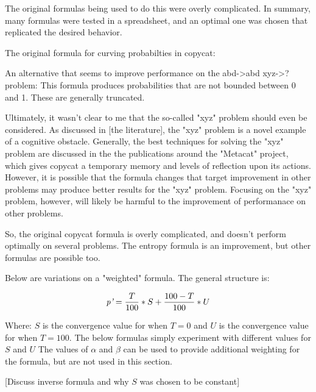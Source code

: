 \documentclass[a4paper]{article}
\begin{document}
            The original formulas being used to do this were overly complicated.
            In summary, many formulas were tested in a spreadsheet, and an optimal one was chosen that replicated the desired behavior.

            The original formula for curving probabilties in copycat:
            

            An alternative that seems to improve performance on the abd->abd xyz->? problem:
            This formula produces probabilities that are not bounded between 0 and 1. These are generally truncated.
            

            Ultimately, it wasn't clear to me that the so-called "xyz" problem should even be considered.
            As discussed in [the literature], the "xyz" problem is a novel example of a cognitive obstacle. 
            Generally, the best techniques for solving the "xyz" problem are discussed in the the publications around the "Metacat" project, which gives copycat a temporary memory and levels of reflection upon its actions.
            However, it is possible that the formula changes that target improvement in other problems may produce better results for the "xyz" problem.
            Focusing on the "xyz" problem, however, will likely be harmful to the improvement of performanace on other problems.

            So, the original copycat formula is overly complicated, and doesn't perform optimally on several problems.
            The entropy formula is an improvement, but other formulas are possible too.

            Below are variations on a "weighted" formula.
            The general structure is:

            \[\emph{p'} = \frac{T}{100} * S + \frac{100-T}{100} * U\]

            Where: $S$ is the convergence value for when $T = 0$ and
                   $U$ is the convergence value for when $T = 100$.
            The below formulas simply experiment with different values for $S$ and $U$
            The values of $\alpha$ and $\beta$ can be used to provide additional weighting for the formula, but are not used in this section.

            

            [Discuss inverse formula and why $S$ was chosen to be constant]
\end{document}

